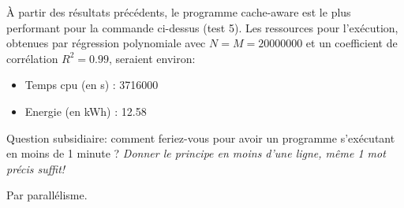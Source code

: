 \documentclass[10pt,a4paper]{article}
\begin{document}
\medskip

À partir des résultats précédents, le programme cache-aware est le plus performant pour la commande ci-dessus (test 5). Les ressources pour l'exécution, obtenues par régression polynomiale avec $N=M=20000000$ et un coefficient de corrélation $R^2=0.99$, seraient environ: 
\begin{itemize}
\item Temps cpu (en s) : 3716000
\item Energie  (en kWh) : 12.58
\end{itemize}

Question subsidiaire: comment feriez-vous pour avoir un programme s'exécutant en moins de 1 minute ? 
{\em Donner le principe en moins d'une ligne, même 1 mot précis suffit! } 

\medskip

Par parallélisme.
\end{document}

